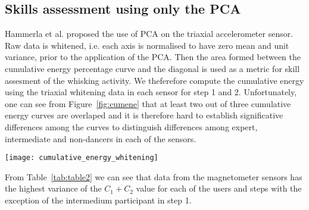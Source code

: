 \documentclass{sigchi}
\begin{document}
\subsection{Skills assessment using only the PCA}
Hammerla et al. \cite{Hammerla2011} proposed the use of PCA on the triaxial accelerometer sensor. 
Raw data is whitened, i.e. each axis is normalised to have zero mean and unit variance, prior to the application of the PCA.
Then the area formed between the cumulative energy percentage curve and the diagonal is used as a metric for skill assesment 
of the whisking activity. %
We theferefore compute the cumulative energy using the triaxial whitening data in each sensor for step 1 and 2.
Unfortunately, one can see from Figure~\ref{fig:cumene} that at least two out of three cumulative energy curves are overlaped 
and it is therefore hard to establish significative differences among the curves to distinguish differences among expert, intermediate and 
non-dancers in each of the sensors.
\begin{figure*}[!t]
\centering    
\texttt{[image: cumulative\_energy\_whitening]}
\caption[PA]{Cumulative energy percentage curves for expert, intermediate and non-dancer users performing step 1 and step 2
using triaxial accelerometer (ACC), gyroscope (GYR), and magnetometer (MAG) sensors.}
\label{fig:cumene}
\end{figure*}
From Table~\ref{tab:table2} we can see that data from the magnetometer sensors has the highest variance 
of the $C_1 + C_2$ value for each of the users and steps with the exception of the intermedium participant in step 1. 

% 
% 
% 
\end{document}
